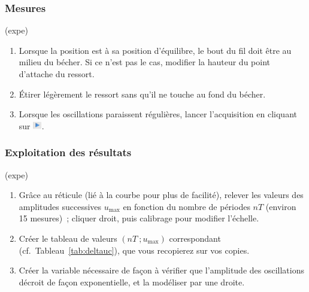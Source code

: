 \documentclass[../main/main.tex]{subfiles}
\begin{document}
\subsubsection{Mesures}

\begin{tcb}(expe){}
	\begin{enumerate}
		\item Lorsque la position est à sa position d'équilibre, le bout du fil doit
		      être au milieu du bécher. Si ce n'est pas le cas, modifier la hauteur du
		      point d'attache du ressort.
		\item Étirer légèrement le ressort sans qu'il ne touche au fond du bécher.
		\item Lorsque les oscillations paraissent régulières, lancer l'acquisition
		      en cliquant sur \includegraphics[width=0.03\textwidth]{bouton_go}.
	\end{enumerate}
\end{tcb}

\subsubsection{Exploitation des résultats}


\begin{tcb}(expe){}
	\begin{enumerate}
		\item Grâce au réticule (lié à la courbe pour plus de facilité), relever les
		      valeurs des amplitudes successives $u_{\max}$ en fonction du nombre de
		      périodes $nT$ (environ 15 mesures)~; cliquer droit, puis calibrage pour
		      modifier l'échelle.

		\item Créer le tableau de valeurs $(nT~; u_{\max})$ correspondant
		      (cf.\ Tableau~\ref{tab:deltauc}), que vous recopierez sur vos copies.

		\item Créer la variable nécessaire de façon à vérifier que l'amplitude
		      des oscillations décroit de façon exponentielle, et la modéliser par une
		      droite.
	\end{enumerate}
\end{tcb}
\end{document}
